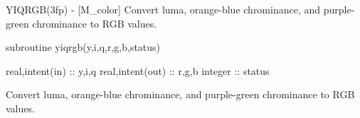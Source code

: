 \begin{DoxyDescription}
\item[\label{_YIQRGB}%
N\+A\+ME ]Y\+I\+Q\+R\+G\+B(3fp) -\/ \mbox{[}M\+\_\+color\mbox{]} Convert luma, orange-\/blue chrominance, and purple-\/green chrominance to R\+GB values. 


\item[S\+Y\+N\+O\+P\+S\+IS ]
\begin{DoxyPre}
    subroutine yiqrgb(y,i,q,r,g,b,status)\end{DoxyPre}



\begin{DoxyPre}     real,intent(in)  :: y,i,q
     real,intent(out) :: r,g,b
     integer          :: status
    \end{DoxyPre}
 


\item[D\+E\+S\+C\+R\+I\+P\+T\+I\+ON ]

Convert luma, orange-\/blue chrominance, and purple-\/green chrominance to R\+GB values.




\end{DoxyDescription}